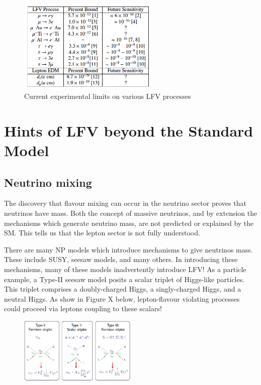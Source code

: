 \documentclass[12pt,a4paper]{article} %
\begin{document}
\begin{figure}[h]
\centering
\includegraphics[width=0.6\textwidth]{images/lfv-bounds.png}
\caption{Current experimental limits on various LFV processes}
\label{}
\end{figure}

\section{Hints of LFV beyond the Standard Model}

\subsection{Neutrino mixing}

The discovery that flavour mixing can occur in the neutrino sector proves that neutrinos have mass. Both the concept of massive neutrinos, and by extension the mechanisms which generate neutrino mass, are not predicted or explained by the SM. This tells us that the lepton sector is not fully understood.

There are many NP models which introduce mechanisms to give neutrinos mass. These include SUSY, seesaw models, and many others. In introducing these mechanisms, many of these models inadvertently introduce LFV! As a particle example, a Type-II seesaw model posits a scalar triplet of Higgs-like particles. This triplet comprises a doubly-charged Higgs, a singly-charged Higgs, and a neutral Higgs. As show in Figure X below, lepton-flavour violating processes could proceed via leptons coupling to these scalars!


\begin{figure}[h]
\centering
\includegraphics[width=0.5\textwidth]{images/seesaw.png}
\caption{}
\label{}
\end{figure}
\end{document}
